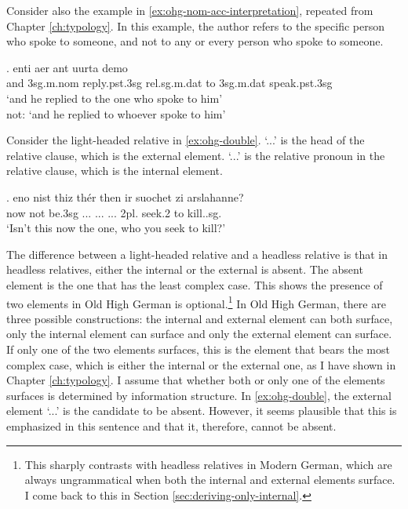 Consider also the example in \ref{ex:ohg-nom-acc-interpretation}, repeated from Chapter \ref{ch:typology}.
In this example, the author refers to the specific person who spoke to someone, and not to any or every person who spoke to someone.

\exg. enti aer {ant uurta} demo  \\
and 3\ac{sg}.\ac{m}.\ac{nom} reply.\ac{pst}.3\ac{sg}\scsub{[dat]} \ac{rel}.\ac{sg}.\ac{m}.\ac{dat} {to 3\ac{sg}.\ac{m}.\ac{dat}} speak.\ac{pst}.3\ac{sg}\scsub{[nom]}\\
`and he replied to the one who spoke to him'\\
not: `and he replied to whoever spoke to him'
 \label{ex:ohg-dat-nom-rep}

 Consider the light-headed relative in \ref{ex:ohg-double}.  `...' is the head of the relative clause, which is the external element.  `...' is the relative pronoun in the relative clause, which is the internal element.

 \exg. eno nist thiz thér then ir suochet zi arslahanne?\\
  now {not be.3\ac{sg}} ... ...
  ... 2\ac{pl}. seek.2 to kill..\ac{sg}.\\
  `Isn't this now the one, who you seek to kill?'\label{ex:ohg-double}

 The difference between a light-headed relative and a headless relative is that in headless relatives, either the internal or the external is absent. The absent element is the one that has the least complex case. This shows the presence of two elements in Old High German is optional.\footnote{
 This sharply contrasts with headless relatives in Modern German, which are always ungrammatical when both the internal and external elements surface. I come back to this in Section \ref{sec:deriving-only-internal}.
 }
 In Old High German, there are three possible constructions: the internal and external element can both surface, only the internal element can surface and only the external element can surface. If only one of the two elements surfaces, this is the element that bears the most complex case, which is either the internal or the external one, as I have shown in Chapter \ref{ch:typology}. I assume that whether both or only one of the elements surfaces is determined by information structure. In \ref{ex:ohg-double}, the external element  `...' is the candidate to be absent. However, it seems plausible that this is emphasized in this sentence and that it, therefore, cannot be absent.


